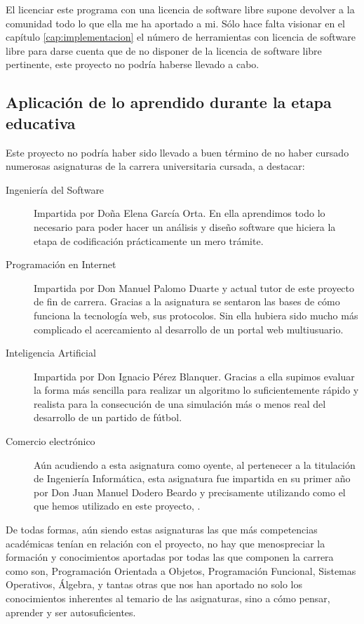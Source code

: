 El licenciar este programa con una licencia de software libre supone devolver a
la comunidad todo lo que ella me ha aportado a mi. Sólo hace falta visionar en
el capítulo \ref{cap:implementacion} el número de herramientas con licencia de
software libre para darse cuenta que de no disponer de la licencia de software
libre pertinente, este proyecto no podría haberse llevado a cabo.

\subsection{Aplicación de lo aprendido durante la etapa educativa}
Este proyecto no podría haber sido llevado a buen término de no haber cursado
numerosas asignaturas de la carrera universitaria cursada, a destacar:

\begin{description}
\item [Ingeniería del Software] Impartida por Doña Elena García Orta. En ella
  aprendimos todo lo necesario para poder hacer un análisis y diseño software
  que hiciera la etapa de codificación prácticamente un mero trámite.
\item [Programación en Internet] Impartida por Don Manuel Palomo Duarte y actual
  tutor de este proyecto de fin de carrera. Gracias a la asignatura se sentaron
  las bases de cómo funciona la tecnología web, sus protocolos. Sin ella hubiera
  sido mucho más complicado el acercamiento al desarrollo de un portal web
  multiusuario.
\item [Inteligencia Artificial] Impartida por Don Ignacio Pérez
  Blanquer. Gracias a ella supimos evaluar la forma más sencilla para realizar
  un algoritmo lo suficientemente rápido y realista para la consecución de una
  simulación más o menos real del desarrollo de un partido de fútbol.
\item [Comercio electrónico] Aún acudiendo a esta asignatura como oyente, al
  pertenecer a la titulación de Ingeniería Informática, esta asignatura fue
  impartida en su primer año por Don Juan Manuel Dodero Beardo y precisamente
  utilizando como  el que hemos utilizado en este proyecto,
  .
\end{description}

De todas formas, aún siendo estas asignaturas las que más competencias
académicas tenían en relación con el proyecto, no hay que menospreciar la
formación y conocimientos aportadas por todas las que componen la carrera como
son, Programación Orientada a Objetos, Programación Funcional, Sistemas
Operativos, Álgebra, y tantas otras que nos han aportado no solo los
conocimientos inherentes al temario de las asignaturas, sino a cómo pensar,
aprender y ser autosuficientes.

